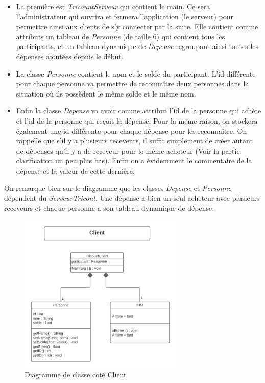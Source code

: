 \documentclass[12,french]{report}
\begin{document}
\begin{itemize}[label=\textbullet]
\item La première est \textit{TricountServeur} qui contient le main. Ce sera l’administrateur qui ouvrira et fermera l’application (le serveur) pour permettre ainsi aux clients de s’y connecter par la suite. Elle contient comme attributs un tableau de \textit{Personne} (de taille 6) qui contient tous les participants, et un tableau dynamique de \textit{Depense} regroupant ainsi toutes les dépenses ajoutées depuis le début.\\

\item La classe \textit{Personne} contient le nom et le solde du participant. L’id différente pour chaque personne va permettre de reconnaître deux personnes dans la situation où ils possèdent le même solde et le même nom.\\

\item Enfin la classe \textit{Depense} va avoir comme attribut l’id de la personne qui achète et l’id de la personne qui reçoit la dépense. Pour la même raison, on stockera également une id différente pour chaque dépense pour les reconnaître. On rappelle que s’il y a plusieurs receveurs, il suffit simplement de créer autant de dépenses qu’il y a de receveur pour le même acheteur (Voir la partie clarification un peu plus bas). Enfin on a évidemment le commentaire de la dépense et la valeur de cette dernière.\\
\end{itemize}

On remarque bien sur le diagramme que les classes \textit{Depense} et \textit{Personne} dépendent du \textit{ServeurTricont}. Une dépense a bien un seul acheteur avec plusieurs receveurs et chaque personne a son tableau dynamique de dépense.\\

\begin{figure}[H]
	\center
	\includegraphics[width=0.7\textwidth]{./Images/Diagramme_de_classe_Client}
	\caption{Diagramme de classe coté Client}
\end{figure}\vspace{0.2cm}
\end{document}
